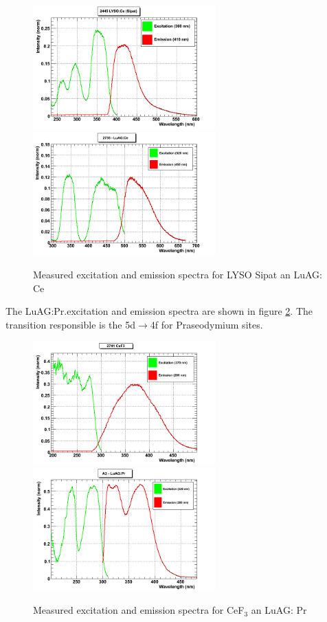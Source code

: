 \begin{figure}[htbp]
\begin{center}
\includegraphics[width=7cm]{../Pictures/Chapter_5/LYSO_Sipat.png}
\includegraphics[width=7cm]{../Pictures/Chapter_5/LuAG_ce.png}
\end{center}
\caption[Sipat - LuAG excitation/emission]{Measured excitation and emission spectra for LYSO Sipat an LuAG: Ce}
\label{fig:luag_lso}
\end{figure}

The LuAG:Pr.excitation and emission spectra are shown in figure \ref{fig:luag_cef3}. The transition responsible is the 5d$\rightarrow$4f for Praseodymium sites.

\begin{figure}[htbp]
\begin{center}
\includegraphics[width=7cm]{../Pictures/Chapter_5/cef3.png}
\includegraphics[width=7cm]{../Pictures/Chapter_5/LuAG_pr.png}
\end{center}
\caption[CeF$_{3}$ - LuAG excitation/emission]{Measured excitation and emission spectra for CeF$_{3}$ an LuAG: Pr}
\label{fig:luag_cef3}
\end{figure}

